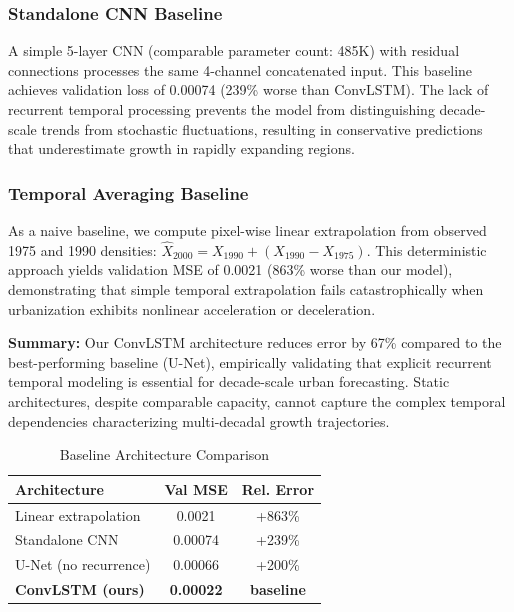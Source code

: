 \documentclass[conference]{IEEEtran}
\begin{document}
\subsubsection{Standalone CNN Baseline}
A simple 5-layer CNN (comparable parameter count: 485K) with residual connections processes the same 4-channel concatenated input. This baseline achieves validation loss of 0.00074 (239\% worse than ConvLSTM). The lack of recurrent temporal processing prevents the model from distinguishing decade-scale trends from stochastic fluctuations, resulting in conservative predictions that underestimate growth in rapidly expanding regions.

\subsubsection{Temporal Averaging Baseline}
As a naive baseline, we compute pixel-wise linear extrapolation from observed 1975 and 1990 densities: $\hat{X}_{2000} = X_{1990} + (X_{1990} - X_{1975})$. This deterministic approach yields validation MSE of 0.0021 (863\% worse than our model), demonstrating that simple temporal extrapolation fails catastrophically when urbanization exhibits nonlinear acceleration or deceleration.

\textbf{Summary:} Our ConvLSTM architecture reduces error by 67\% compared to the best-performing baseline (U-Net), empirically validating that explicit recurrent temporal modeling is essential for decade-scale urban forecasting. Static architectures, despite comparable capacity, cannot capture the complex temporal dependencies characterizing multi-decadal growth trajectories.

\begin{table}[htbp]
\caption{Baseline Architecture Comparison}
\begin{center}
\begin{tabular}{lcc}
\toprule
\textbf{Architecture} & \textbf{Val MSE} & \textbf{Rel. Error} \\
\midrule
Linear extrapolation & 0.0021 & +863\% \\
Standalone CNN & 0.00074 & +239\% \\
U-Net (no recurrence) & 0.00066 & +200\% \\
\textbf{ConvLSTM (ours)} & \textbf{0.00022} & \textbf{baseline} \\
\bottomrule
\end{tabular}
\label{tab:baselines}
\end{center}
\end{table}
\end{document}

